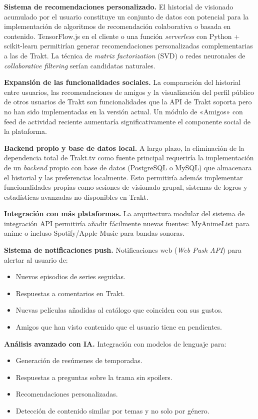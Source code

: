\textbf{Sistema de recomendaciones personalizado.} El historial de visionado acumulado por el usuario constituye un conjunto de datos con potencial para la implementación de algoritmos de recomendación colaborativa o basada en contenido. TensorFlow.js en el cliente o una función \textit{serverless} con Python + scikit-learn permitirían generar recomendaciones personalizadas complementarias a las de Trakt. La técnica de \textit{matrix factorization} (SVD) o redes neuronales de \textit{collaborative filtering} serían candidatas naturales.

\textbf{Expansión de las funcionalidades sociales.} La comparación del historial entre usuarios, las recomendaciones de amigos y la visualización del perfil público de otros usuarios de Trakt son funcionalidades que la API de Trakt soporta pero no han sido implementadas en la versión actual. Un módulo de «Amigos» con feed de actividad reciente aumentaría significativamente el componente social de la plataforma.

\textbf{Backend propio y base de datos local.} A largo plazo, la eliminación de la dependencia total de Trakt.tv como fuente principal requeriría la implementación de un \textit{backend} propio con base de datos (PostgreSQL o MySQL) que almacenara el historial y las preferencias localmente. Esto permitiría además implementar funcionalidades propias como sesiones de visionado grupal, sistemas de logros y estadísticas avanzadas no disponibles en Trakt.

\textbf{Integración con más plataformas.} La arquitectura modular del sistema de integración API permitiría añadir fácilmente nuevas fuentes: MyAnimeList para anime o incluso Spotify/Apple Music para bandas sonoras.

\textbf{Sistema de notificaciones push.} Notificaciones web (\textit{Web Push API}) para alertar al usuario de:
\begin{itemize}
\item Nuevos episodios de series seguidas.
\item Respuestas a comentarios en Trakt.
\item Nuevas películas añadidas al catálogo que coinciden con sus gustos.
\item Amigos que han visto contenido que el usuario tiene en pendientes.
\end{itemize}

\textbf{Análisis avanzado con IA.} Integración con modelos de lenguaje para:
\begin{itemize}
\item Generación de resúmenes de temporadas.
\item Respuestas a preguntas sobre la trama sin spoilers.
\item Recomendaciones personalizadas.
\item Detección de contenido similar por temas y no solo por género.
\end{itemize}
